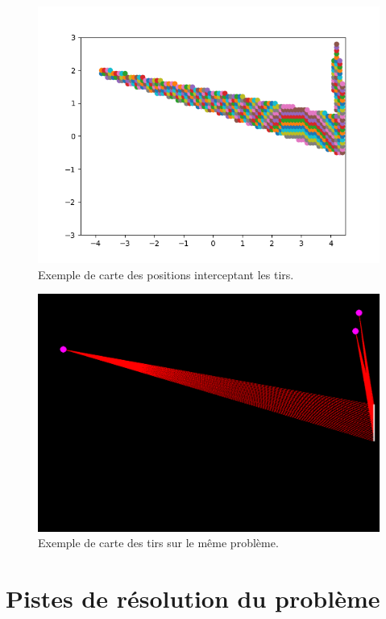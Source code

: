 \documentclass[12pt]{article}
\begin{document}
\begin{figure}[h!]
  \centering
  \includegraphics[width = 13cm]{terrain_placements.png}
  \caption{Exemple de carte des positions interceptant les tirs.}
  \label{figure:terrain_placements}
\end{figure}

\begin{figure}[h!]
  \centering
  \includegraphics[width = 13cm]{terrain_tirs.png}
  \caption{Exemple de carte des tirs sur le même problème.}
  \label{figure:terrain_tirs}
\end{figure}

\newpage

\section{Pistes de résolution du problème}
\end{document}
